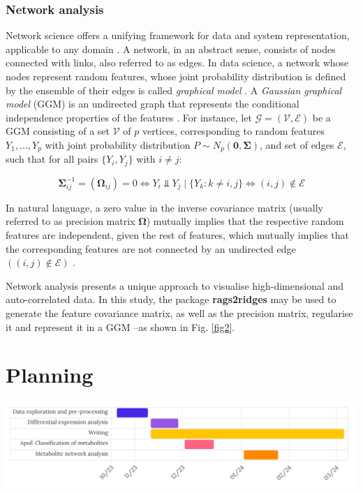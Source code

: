 \documentclass{amsart}
\theoremstyle{plain}
\begin{document}
\subsubsection{Network analysis}
Network science offers a unifying framework for data and system representation, applicable to any domain \cite{Barabasi2015NetworkScience}. A network, in an abstract sense, consists of nodes connected with links, also referred to as edges. In data science, a network whose nodes represent random features, whose joint probability distribution is defined by the ensemble of their edges is called \textit{graphical model} \cite{Peeters2022Rags2ridges:Matrices}. A \textit{Gaussian graphical model} (GGM) is an undirected graph that represents the conditional independence properties of the features \cite{KollerProbabilisticTechniques}. For instance, let $\mathcal{G=(V,E)}$ be a GGM consisting of a set $\mathcal{V}$ of $p$ vertices, corresponding to random features $Y_1,...,Y_p$ with joint probability distribution $P \sim N_p(\mathbf{0, \Sigma})$, and set of edges $\mathcal{E}$, such that for all pairs $\{Y_i , Y_j\}$ with $i\neq j$:

\[ \mathbf{\Sigma}_{ij}^{-1} = (\mathbf{\Omega}_{ij})=0 \Longleftrightarrow Y_i \Perp Y_j\mid\{Y_k : k \neq i,j\} \Longleftrightarrow (i, j) \notin \mathcal{E} \]

In natural language, a zero value in the inverse covariance matrix (usually referred to as precision matrix $\mathbf{\Omega}$) mutually implies that the respective random features are independent, given the rest of features, which mutually implies that the corresponding features are not connected by an undirected edge $((i, j) \notin \mathcal{E})$ \cite{Peeters2022Rags2ridges:Matrices}.

Network analysis presents a unique approach to visualise high-dimensional and auto-correlated data. In this study, the package \textbf{rags2ridges} \cite{Peeters2022Rags2ridges:Matrices} may be used to generate the feature covariance matrix, as well as the precision matrix, regularise it and represent it in a GGM --as shown in Fig. \ref{fig2}.


\section{Planning}
\hspace*{-0.04\linewidth}\includegraphics[width=1.04\linewidth]{figures/plan@2x.png}
\end{document}
